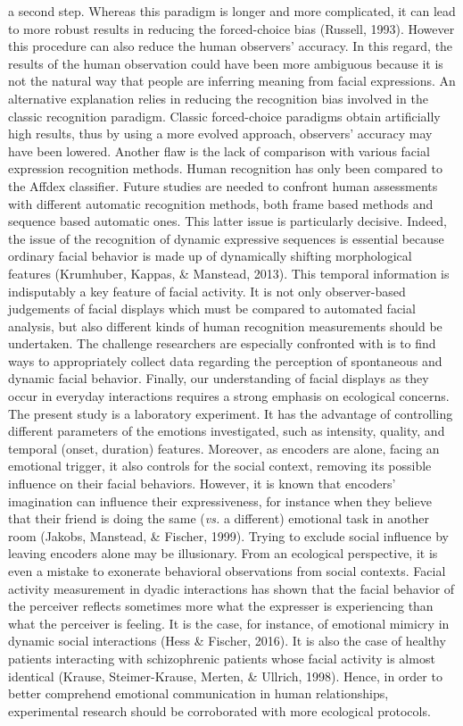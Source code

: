\documentclass[
  english,
  doc]{apa7}
\begin{document}
a second step. Whereas this paradigm is longer and more complicated, it can lead to more robust results in reducing the forced-choice bias (Russell, 1993). However this procedure can also reduce the human observers' accuracy. In this regard, the results of the human observation could have been more ambiguous because it is not the natural way that people are inferring meaning from facial expressions. An alternative explanation relies in reducing the recognition bias involved in the classic recognition paradigm. Classic forced-choice paradigms obtain artificially high results, thus by using a more evolved approach, observers' accuracy may have been lowered. Another flaw is the lack of comparison with various facial expression recognition methods. Human recognition has only been compared to the Affdex classifier. Future studies are needed to confront human assessments with different automatic recognition methods, both frame based methods and sequence based automatic ones. This latter issue is particularly decisive. Indeed, the issue of the recognition of dynamic expressive sequences is essential because ordinary facial behavior is made up of dynamically shifting morphological features (Krumhuber, Kappas, \& Manstead, 2013). This temporal information is indisputably a key feature of facial activity. It is not only observer-based judgements of facial displays which must be compared to automated facial analysis, but also different kinds of human recognition measurements should be undertaken. The challenge researchers are especially confronted with is to find ways to appropriately collect data regarding the perception of spontaneous and dynamic facial behavior. Finally, our understanding of facial displays as they occur in everyday interactions requires a strong emphasis on ecological concerns. The present study is a laboratory experiment. It has the advantage of controlling different parameters of the emotions investigated, such as intensity, quality, and temporal (onset, duration) features. Moreover, as encoders are alone, facing an emotional trigger, it also controls for the social context, removing its possible influence on their facial behaviors. However, it is known that encoders' imagination can influence their expressiveness, for instance when they believe that their friend is doing the same (\emph{vs.} a different) emotional task in another room (Jakobs, Manstead, \& Fischer, 1999). Trying to exclude social influence by leaving encoders alone may be illusionary. From an ecological perspective, it is even a mistake to exonerate behavioral observations from social contexts. Facial activity measurement in dyadic interactions has shown that the facial behavior of the perceiver reflects sometimes more what the expresser is experiencing than what the perceiver is feeling. It is the case, for instance, of emotional mimicry in dynamic social interactions (Hess \& Fischer, 2016). It is also the case of healthy patients interacting with schizophrenic patients whose facial activity is almost identical (Krause, Steimer-Krause, Merten, \& Ullrich, 1998). Hence, in order to better comprehend emotional communication in human relationships, experimental research should be corroborated with more ecological protocols.
\end{document}
